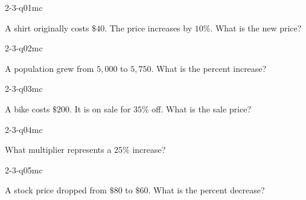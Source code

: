 

\begin{practiceQuestion}{2-3-q01}{mc}
\begin{questionText}
A shirt originally costs $\$40$. The price increases by $10\%$. What is the new price?
\end{questionText}
\end{practiceQuestion}

\begin{practiceQuestion}{2-3-q02}{mc}
\begin{questionText}
A population grew from $5{,}000$ to $5{,}750$. What is the percent increase?
\end{questionText}
\end{practiceQuestion}

\begin{practiceQuestion}{2-3-q03}{mc}
\begin{questionText}
A bike costs $\$200$. It is on sale for $35\%$ off. What is the sale price?
\end{questionText}
\end{practiceQuestion}

\begin{practiceQuestion}{2-3-q04}{mc}
\begin{questionText}
What multiplier represents a $25\%$ increase?
\end{questionText}
\end{practiceQuestion}

\begin{practiceQuestion}{2-3-q05}{mc}
\begin{questionText}
A stock price dropped from $\$80$ to $\$60$. What is the percent decrease?
\end{questionText}
\end{practiceQuestion}

